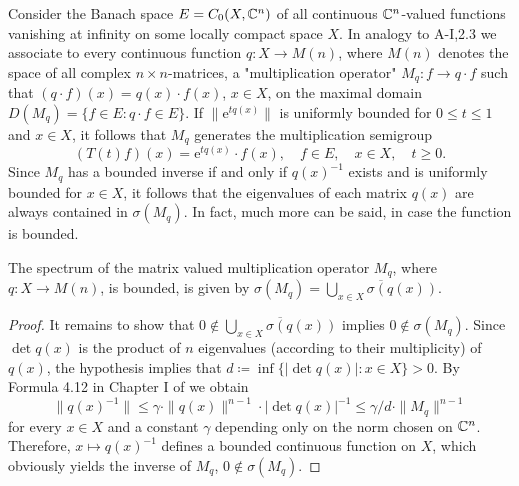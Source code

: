 Consider the Banach space $E = C_{0}(X,\mathbb{C}^{n})$ of all continuous $\mathbb{C}^{n}$-valued functions vanishing at infinity on some locally compact space $X$.
In analogy to A-I,2.3 we associate to every continuous function $q \colon X \to M(n)$, where $M(n)$ denotes the space of all complex $n\times n$-matrices, a "multiplication operator" $M_{q} \colon f \to q\cdot f$ such that $(q\cdot f)(x) = q(x)\cdot f(x)$, $x \in X$, on the maximal domain $D(M_{q}) = \{f \in E \colon q\cdot f \in E\}$.
If $\|\mathrm{e}^{tq(x)}\|$ is uniformly bounded for $0 \leq t \leq 1$ and $x \in X$, it follows that $M_{q}$ generates the multiplication semigroup
\[
(T(t)f)(x) = \mathrm{e}^{tq(x)}\cdot f(x), \quad f \in E, \quad x \in X, \quad t \geq 0 .
\]
Since $M_{q}$ has a bounded inverse if and only if $q(x)^{-1}$ exists and is uniformly bounded for $x \in X$, it follows that the eigenvalues of each matrix $q(x)$ are always contained in $\sigma(M_{q})$.
In fact, much more can be said, in case the function is bounded.
\begin{lemma}\label{lem:a3-7.1}
The spectrum of the matrix valued multiplication operator $M_{q}$, where $q \colon X \to M(n)$, is bounded, is given by $\sigma(M_{q}) = \overline{\bigcup_{x\in X} \sigma(q(x))}$.
\end{lemma}
\begin{proof}
It remains to show that $0 \notin \overline{\bigcup_{x\in X} \sigma(q(x))}$ implies $0 \notin \sigma(M_{q})$.
Since $\det q(x)$ is the product of $n$ eigenvalues (according to their multiplicity) of $q(x)$, the hypothesis implies that $d \coloneqq \inf\{|\det q(x)| \colon x \in X\} > 0$.
By Formula 4.12 in Chapter I of \citet{kato:1966} we obtain
\[
\|q(x)^{-1}\| \leq \gamma \cdot \|q(x)\|^{n-1} \cdot |\det q(x)|^{-1} \leq \gamma/d \cdot \|M_{q}\|^{n-1}
\]
for every $x \in X$ and a constant $\gamma$ depending only on the norm chosen on $\mathbb{C}^{n}$.
Therefore, $x \mapsto q(x)^{-1}$ defines a bounded continuous function on $X$, which obviously yields the inverse of $M_{q}$, \ie $0 \notin \sigma(M_{q})$.
\end{proof}

